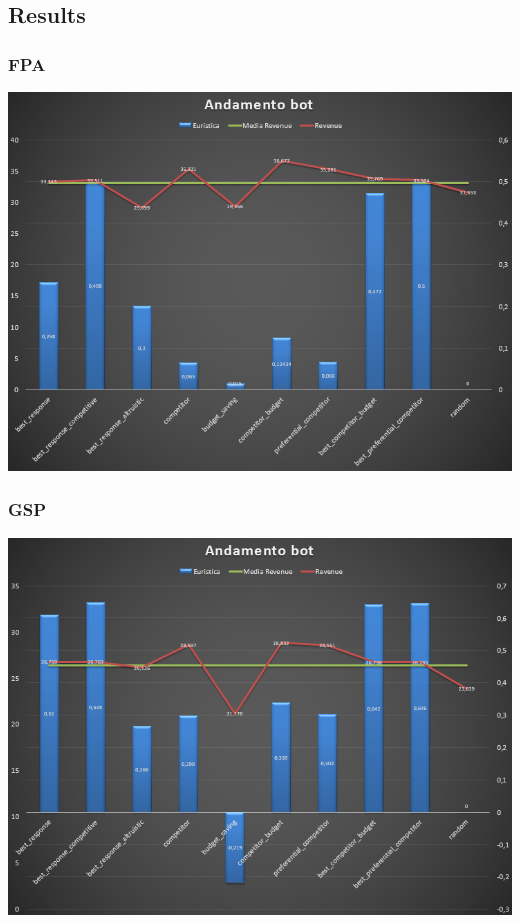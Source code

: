 \documentclass{beamer}
\begin{document}
\subsection{Results}
\begin{frame}
\frametitle{FPA}
\begin{center}
\includegraphics[scale=0.46]{img/Auctions/FPA_all.PNG} 
\end{center}
\end{frame}

\begin{frame}
\frametitle{GSP}
\begin{center}
\includegraphics[scale=0.46]{img/Auctions/GSP_all.PNG} 
\end{center}
\end{frame}
\end{document}
